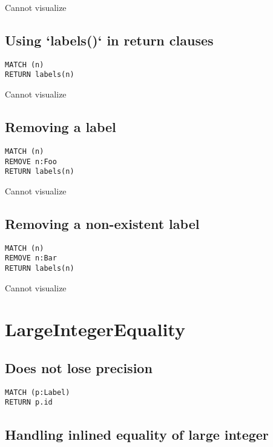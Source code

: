 Cannot visualize
\subsection{Using `labels()` in return clauses}

\begin{lstlisting}
MATCH (n)
RETURN labels(n)
\end{lstlisting}

Cannot visualize
\subsection{Removing a label}

\begin{lstlisting}
MATCH (n)
REMOVE n:Foo
RETURN labels(n)
\end{lstlisting}

Cannot visualize
\subsection{Removing a non-existent label}

\begin{lstlisting}
MATCH (n)
REMOVE n:Bar
RETURN labels(n)
\end{lstlisting}

Cannot visualize
\section{LargeIntegerEquality}

\subsection{Does not lose precision}

\begin{lstlisting}
MATCH (p:Label)
RETURN p.id
\end{lstlisting}

\subsection{Handling inlined equality of large integer}


